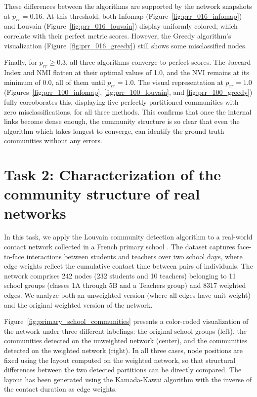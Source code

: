 \documentclass{article}
\begin{document}
These differences between the algorithms are supported by the network snapshots at $p_{rr} = 0.16$. At this threshold, both Infomap (Figure~\ref{fig:prr_016_infomap}) and Louvain (Figure~\ref{fig:prr_016_louvain}) display uniformly colored, which correlate with their perfect metric scores. However, the Greedy algorithm's visualization (Figure~\ref{fig:prr_016_greedy}) still shows some misclassified nodes.

Finally, for $p_{rr} \ge 0.3$, all three algorithms converge to perfect scores. The Jaccard Index and NMI flatten at their optimal values of 1.0, and the NVI remains at its minimum of 0.0, all of them until $p_{rr} = 1.0$. The visual representation at $p_{rr} = 1.0$ (Figures~\ref{fig:prr_100_infomap}, \ref{fig:prr_100_louvain}, and \ref{fig:prr_100_greedy}) fully corroborates this, displaying five perfectly partitioned communities with zero misclassifications, for all three methods. This confirms that once the internal links become dense enough, the community structure is so clear that even the algorithm which takes longest to converge, can identify the ground truth communities without any errors.


\section{Task 2: Characterization of the community structure of real networks}
 
In this task, we apply the Louvain community detection algorithm to a real-world contact network collected in a French primary school \cite{stehle2011high}. The dataset captures face-to-face interactions between students and teachers over two school days, where edge weights reflect the cumulative contact time between pairs of individuals. The network comprises 242 nodes (232 students and 10 teachers) belonging to 11 school groups (classes 1A through 5B and a Teachers group) and 8317 weighted edges. We analyze both an unweighted version (where all edges have unit weight) and the original weighted version of the network.
 
Figure~\ref{fig:primary_school_communities} presents a color-coded visualization of the network under three different labelings: the original school groups (left), the communities detected on the unweighted network (center), and the communities detected on the weighted network (right). In all three cases, node positions are fixed using the layout computed on the weighted network, so that structural differences between the two detected partitions can be directly compared. The layout has been generated using the Kamada-Kawai algorithm with the inverse of the contact duration as edge weights.
 
\end{document}
